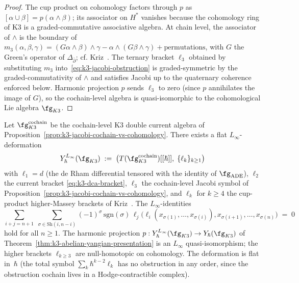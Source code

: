 \begin{proof}
The cup product on cohomology factors through $p$ as
$[\alpha \cup \beta] = p(\alpha \wedge \beta)$; its associator on
$H^*$ vanishes because the cohomology ring of K$3$ is a
graded-commutative associative algebra. At chain level, the
associator of $\wedge$ is the boundary of $m_3(\alpha, \beta, \gamma)
= (G\alpha \wedge \beta) \wedge \gamma
 - \alpha \wedge (G\beta \wedge \gamma) + \text{permutations}$,
with $G$ the Green's operator of $\Delta_{\bar\partial}$; cf.
Kriz~\cite{Kriz94}. The ternary bracket $\ell_3$ obtained by
substituting $m_3$ into~\eqref{eq:k3-jacobi-obstruction} is
graded-symmetric by the graded-commutativity of $\wedge$ and
satisfies Jacobi up to the quaternary coherence enforced below.
Harmonic projection $p$ sends $\ell_3$ to zero (since $p$ annihilates
the image of $G$), so the cochain-level algebra is quasi-isomorphic
to the cohomological Lie algebra $\fg_{K3}$.
\end{proof}

\begin{theorem}
\label{thm:k3-linfty-yangian}
Let $\fg_{K3}^{\mathrm{cochain}}$ be the cochain-level K3 double
current algebra of
Proposition~\ref{prop:k3-jacobi-cochain-vs-cohomology}. There exists
a flat $L_\infty$-deformation
\[
 Y_\hbar^{L_\infty}(\fg_{K3})
 \;:=\; \bigl(T(\fg_{K3}^{\mathrm{cochain}})[[\hbar]],\;
 \{\ell_k\}_{k \geq 1}\bigr)
\]
with $\ell_1 = d$ (the de Rham differential tensored with the identity
of $\fg_{\mathrm{ADE}}$), $\ell_2$ the current bracket
\eqref{eq:k3-dca-bracket}, $\ell_3$ the cochain-level Jacobi symbol of
Proposition~\ref{prop:k3-jacobi-cochain-vs-cohomology}, and
$\ell_k$ for $k \geq 4$ the cup-product higher-Massey brackets
of Kriz~\cite{Kriz94}. The $L_\infty$-identities
\[
 \sum_{i + j = n + 1}\;\sum_{\sigma \in \mathrm{Sh}(i, n - i)}
 (-1)^\sigma\,\mathrm{sgn}(\sigma)\,
 \ell_j\bigl(\ell_i(x_{\sigma(1)}, \dots, x_{\sigma(i)}),
 x_{\sigma(i+1)}, \dots, x_{\sigma(n)}\bigr)
 \;=\; 0
\]
hold for all $n \geq 1$. The harmonic projection
$p : Y_\hbar^{L_\infty}(\fg_{K3}) \to Y_\hbar(\fg_{K3})$ of
Theorem~\ref{thm:k3-abelian-yangian-presentation} is an $L_\infty$
quasi-isomorphism; the higher brackets $\ell_{k \geq 3}$ are null-homotopic
on cohomology. The deformation is flat in~$\hbar$
(the total symbol $\sum_k \hbar^{k-2} \ell_k$ has no obstruction in
any order, since the obstruction cochain lives in a Hodge-contractible
complex).
\end{theorem}


